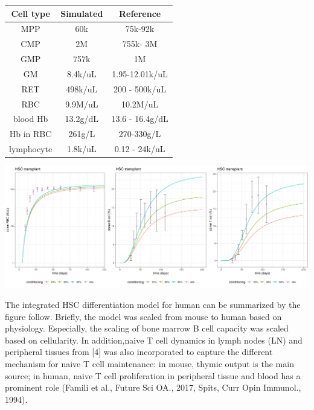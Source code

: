 \documentclass[a0paper,portrait]{baposter}
\begin{document}
\begin{poster}
{\begin{minipage}[ht]{0.42\linewidth}
\begin{center}
\fontsize{6.5pt}{6.5pt}\selectfont
\begin{tabular}{ c c c }
Cell type & Simulated & Reference \\ 
\hline
\scriptsize
MPP & 60k & 75k-92k \\  
CMP & 2M & 755k- 3M  \\
GMP & 757k & 1M  \\  
GM & 8.4k/uL & 1.95-12.01k/uL \\  
RET & 498k/uL & 200 - 500k/uL   \\    
RBC & 9.9M/uL & 10.2M/uL   \\ 
blood Hb & 13.2g/dL & 13.6 - 16.4g/dL   \\ 
Hb in RBC & 261g/L & 270-330g/L  \\ 
lymphocyte & 1.8k/uL & 0.12 - 24k/uL  \\ 
\hline
\end{tabular}
\end{center}
\end{minipage}
\hspace{0.2cm}
\begin{minipage}[ht]{0.5\linewidth}
\includegraphics[width=\textwidth]{../img/mouse_RBC_T_B_HSCT.png}
\end{minipage}

The integrated HSC differentiation model for human can be summarized by the figure follow. 
Briefly, the model was scaled from mouse to human based on physiology. Especially, the scaling of bone marrow B cell capacity was scaled based on cellularity. 
In addition,naive T cell dynamics in lymph nodes (LN) and peripheral tissues from [4] was also incorporated to capture the different mechanism for naive T cell maintenance: in mouse, thymic output is the main source; in human, naive T cell proliferation in peripheral tissue and blood has a prominent role (Famili et al., Future Sci OA., 2017, Spits, Curr Opin Immunol., 1994). 

}
\end{poster}
\end{document}
